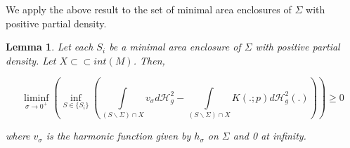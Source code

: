 \documentclass{amsart}
\newcommand{\hm}{\mathscr{H}}
\newcommand{\s}{\Sigma}
\newtheorem{lemma}{Lemma}
\theoremstyle{named}
\begin{document}

We apply the above result to the set of minimal area enclosures of $\s$ with positive partial density. 

\begin{lemma} \label{lemma: uniform_ineq}
    Let each $S_i$ be a minimal area enclosure of $\Sigma$ with positive partial density. Let $X \subset\subset int(M)$. Then,

    \begin{equation}
        \liminf\limits_{\sigma \xrightarrow{} 0^{+}} \left( \inf\limits_{S \in \{S_i\}} \left( 
        \int\limits_{(S \backslash \Sigma) \cap X} v_{\sigma}d\hm^2_g - \int\limits_{(S \backslash \Sigma) \cap X} K (.;p)d\hm^2_g (.) \right) \right) \geq 0
    \end{equation}

    where $v_{\sigma}$ is the harmonic function given by $h_{\sigma}$ on $\Sigma$ and 0 at infinity.
    
\end{lemma}
\end{document}
